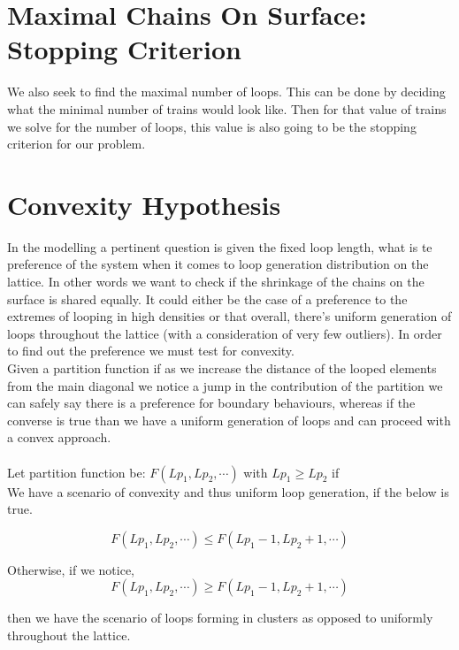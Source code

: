 \documentclass[10pt,letterpaper]{article}
\begin{document}
\newpage
\section*{Maximal Chains On Surface: Stopping Criterion}

We also seek to find the maximal number of loops. This can be done by deciding what the minimal number of trains would look like. Then for that value of trains we solve for the number of loops, this value is also going to be the stopping criterion for our problem.



\section*{Convexity Hypothesis}
In the modelling a pertinent question is given the fixed loop length, what is te preference of the system when it comes to loop generation distribution on the lattice. In other words we want to check if the shrinkage of the chains on the surface is shared equally. It could either be the case of a preference to the extremes of looping in high densities or that overall, there's uniform generation of loops throughout the lattice (with a consideration of very few outliers). In order to find out the preference we must test for convexity.\\

\noindent Given a partition function if as we increase the distance of the looped elements from the main diagonal we notice a jump in the contribution of the partition we can safely say there is a preference for boundary behaviours, whereas if the converse is true than we have a uniform generation of loops and can proceed with a convex approach.\\\\

\noindent Let partition function be: $F(Lp_1,Lp_2, \cdots)$ with $Lp_1\geq Lp_2$ if\\

\noindent We have a scenario of convexity and thus uniform loop generation, if the below is true.

$$F(Lp_1,Lp_2, \cdots)\leq F(Lp_1-1,Lp_2+1, \cdots)$$

\noindent Otherwise, if we notice,
$$F(Lp_1,Lp_2, \cdots)\geq F(Lp_1-1,Lp_2+1, \cdots)$$ 

\noindent then we have the scenario of loops forming in clusters as opposed to uniformly throughout the lattice.
\end{document}
